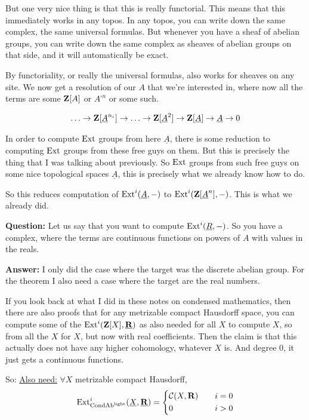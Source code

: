 But one very nice thing is that this is really functorial. This means that this immediately works in any topos. In any topos, you can write down the same complex, the same universal formulas. But whenever you have a sheaf of abelian groups, you can write down the same complex as sheaves of abelian groups on that side, and it will automatically be exact.

By functoriality, or really the universal formulas, also works for sheaves on any site. We now get a resolution of our $A$ that we're interested in, where now all the terms are some $\mathbf Z[A]$ or $A^{\square n}$ or some such. 

\begin{align*}
\ldots \to \mathbf Z[\underline{A}^{n_i}] \to \ldots \to \mathbf Z[\underline{A}^2] \to \mathbf Z[\underline{A}] \to \underline{A} \to 0
\end{align*}


In order to compute $\operatorname{Ext}$ groups from here $\underline{A}$, there is some reduction to computing $\operatorname{Ext}$ groups from these free guys on them. But this is precisely the thing that I was talking about previously. So $\operatorname{Ext}$ groups from such free guys on some nice topological spaces $\underline{A}$, this is precisely what we already know how to do. 

So this reduces computation of $\operatorname{Ext}^i(\underline{A},-)$ to $\operatorname{Ext}^i(\mathbf Z[\underline{A}^n],-)$. This is what we already did.

\textbf{Question:} Let us say that you want to compute $\operatorname{Ext}^i(\underline{R},-)$. So you have a complex, where the terms are continuous functions on powers of $A$ with values in the reals. 

\textbf{Answer:} I only did the case where the target was the discrete abelian group. For the theorem  I also need a case where the target are the real numbers.

If you look back at what I did in these notes on condensed mathematics, then there are also proofs that for any metrizable compact Hausdorff space, you can compute some of the $\operatorname{Ext}^i(\mathbf Z[X], \underline{\mathbf R})$ as also needed for all $X$ to compute $X$, so from all the $X$ for $X$, but now with real coefficients. Then the claim is that this actually does not have any higher cohomology, whatever $X$ is. And degree 0, it just gets a continuous functions.

So:
\underline{Also need:} $\forall X$ metrizable compact Hausdorff, 
\begin{align*}
\operatorname{Ext}^i_{\mathrm{Cond}\mathrm{Ab}^{\mathrm{light}}}(\underline{X},\underline{\mathbf R}) = 
\left\{
    \begin{aligned}
         & \mathcal{C}(X,\mathbf R) \quad & i = 0 \\
         & 0 \quad & i > 0 \\
    \end{aligned}
\right.
\end{align*}

